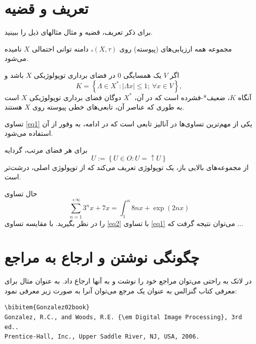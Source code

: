 \section{تعریف و قضیه}
برای ذکر تعریف، قضیه و مثال مثالهای ذیل را ببینید.
\begin{definition}
مجموعه همه ارزیابی‌های  (پیوسته)  روی $(X,\tau)$، دامنه توانی احتمالی
$ X $
نامیده می‌شود.
\end{definition}
\begin{theorem}
اگر $ V $ یک همسایگی $ 0 $ در فضای برداری
 توپولوژیکی $ X $ باشد و
\begin{equation}\label{eq1}
K=\left\lbrace \Lambda \in X^{*}:|\Lambda x|\leqslant 1 ; \ \forall x\in V\right\rbrace,
\end{equation}
آنگاه $ K $،  ضعیف*-فشرده است که در آن، $ X^{*} $ دوگان
 فضای برداری توپولوژیکی $ X $ است به ‌طوری که عناصر آن،  تابعی‌های
خطی پیوسته
 روی $X$ هستند.
\end{theorem}
تساوی \eqref{eq1} یکی از مهم‌ترین تساوی‌ها در آنالیز تابعی است که در ادامه، به وفور از آن استفاده می‌شود.
\begin{example}
برای هر فضای مرتب، گردایه
$$U:=\left\lbrace U\in O: U=\uparrow U\right\rbrace $$
از مجموعه‌های بالایی باز، یک توپولوژی تعریف می‌کند که از توپولوژی اصلی، درشت‌تر  است.
\end{example}
حال تساوی
\begin{equation}\label{eq2}
\sum_{n=1}^{+\infty} 3^{n}x+7x=\int_{1}^{n}8nx+\exp{(2nx)}
\end{equation}
را در نظر بگیرید. با مقایسه تساوی \eqref{eq2} با تساوی \eqref{eq1} می‌توان نتیجه گرفت که ...


\section{چگونگی نوشتن و ارجاع به مراجع}\label{Sec:Ref}

در لاتک به راحتی می‌توان مراجع خود را نوشت و به آنها ارجاع داد. به عنوان مثال برای معرفی کتاب گنزالس \cite{Gonzalez02book} به عنوان یک مرجع می‌توان آنرا به صورت زیر معرفی نمود:

\singlespacing
\begin{LTR}
\begin{verbatim}
\bibitem{Gonzalez02book}
Gonzalez, R.C., and Woods, R.E. {\em Digital Image Processing}, 3rd ed..
Prentice-Hall, Inc., Upper Saddle River, NJ, USA, 2006.
\end{verbatim}
\end{LTR}
\doublespacing


